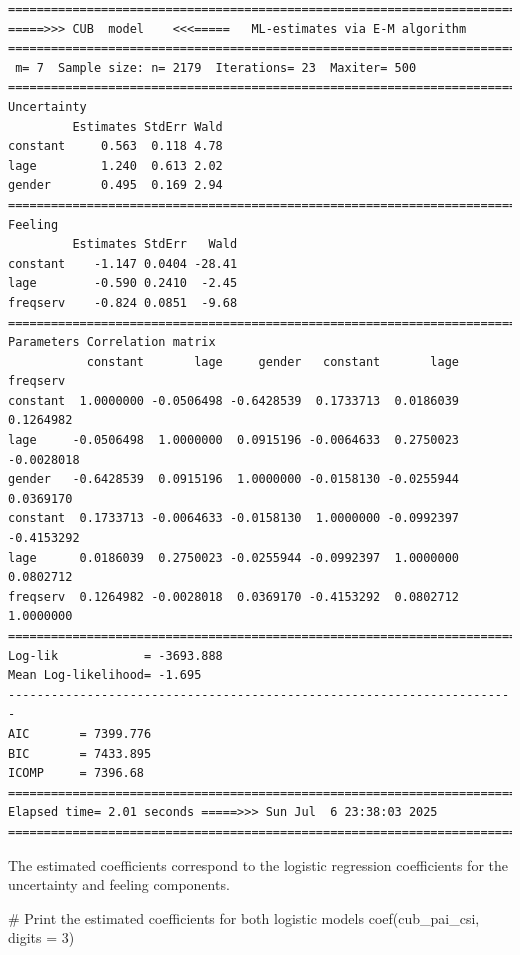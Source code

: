 \documentclass[
  letterpaper,
  DIV=11,
  numbers=noendperiod]{scrartcl}
\newenvironment{Shaded}{\begin{snugshade}}{\end{snugshade}}
\newcommand{\AttributeTok}[1]{\textcolor[rgb]{0.40,0.45,0.13}{#1}}
\newcommand{\CommentTok}[1]{\textcolor[rgb]{0.37,0.37,0.37}{#1}}
\newcommand{\DecValTok}[1]{\textcolor[rgb]{0.68,0.00,0.00}{#1}}
\newcommand{\FunctionTok}[1]{\textcolor[rgb]{0.28,0.35,0.67}{#1}}
\newcommand{\NormalTok}[1]{\textcolor[rgb]{0.00,0.23,0.31}{#1}}
\begin{document}
\begin{verbatim}
======================================================================= 
=====>>> CUB  model    <<<=====   ML-estimates via E-M algorithm   
======================================================================= 
 m= 7  Sample size: n= 2179  Iterations= 23  Maxiter= 500 
======================================================================= 
Uncertainty                                            
         Estimates StdErr Wald
constant     0.563  0.118 4.78
lage         1.240  0.613 2.02
gender       0.495  0.169 2.94
======================================================================= 
Feeling                                            
         Estimates StdErr   Wald
constant    -1.147 0.0404 -28.41
lage        -0.590 0.2410  -2.45
freqserv    -0.824 0.0851  -9.68
======================================================================= 
Parameters Correlation matrix 
           constant       lage     gender   constant       lage   freqserv
constant  1.0000000 -0.0506498 -0.6428539  0.1733713  0.0186039  0.1264982
lage     -0.0506498  1.0000000  0.0915196 -0.0064633  0.2750023 -0.0028018
gender   -0.6428539  0.0915196  1.0000000 -0.0158130 -0.0255944  0.0369170
constant  0.1733713 -0.0064633 -0.0158130  1.0000000 -0.0992397 -0.4153292
lage      0.0186039  0.2750023 -0.0255944 -0.0992397  1.0000000  0.0802712
freqserv  0.1264982 -0.0028018  0.0369170 -0.4153292  0.0802712  1.0000000
======================================================================= 
Log-lik            = -3693.888 
Mean Log-likelihood= -1.695 
----------------------------------------------------------------------- 
AIC       = 7399.776 
BIC       = 7433.895 
ICOMP     = 7396.68 
======================================================================= 
Elapsed time= 2.01 seconds =====>>> Sun Jul  6 23:38:03 2025 
======================================================================= 
\end{verbatim}

The estimated coefficients correspond to the logistic regression
coefficients for the uncertainty and feeling components.

\begin{Shaded}
\begin{Highlighting}[]
\CommentTok{\# Print the estimated coefficients for both logistic models}
\FunctionTok{coef}\NormalTok{(cub\_pai\_csi, }\AttributeTok{digits =} \DecValTok{3}\NormalTok{)}
\end{Highlighting}
\end{Shaded}
\end{document}
